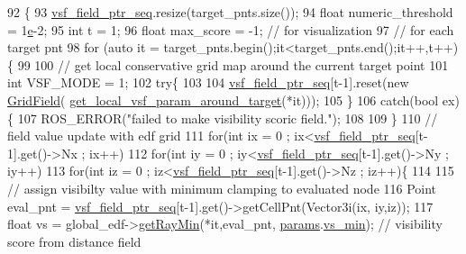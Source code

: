 \begin{DoxyCode}
92                                                                                             \{
93     \hyperlink{class_preplanner_aab0f91e34b86eaa581c7642ba5059308}{vsf\_field\_ptr\_seq}.resize(target\_pnts.size());
94     \textcolor{keywordtype}{float} numeric\_threshold = 1\hyperlink{namespace__setup__util_acdce690b925de33d6249bbbfa1109d61}{e}-2;
95     \textcolor{keywordtype}{int} t = 1;
96     \textcolor{keywordtype}{float} max\_score = -1;  \textcolor{comment}{// for visualization }
97     \textcolor{comment}{// for each target pnt}
98     \textcolor{keywordflow}{for} (\textcolor{keyword}{auto} it = target\_pnts.begin();it<target\_pnts.end();it++,t++)\{
99         
100         \textcolor{comment}{// get local conservative grid map around the current target point}
101         \textcolor{keywordtype}{int} VSF\_MODE = 1;
102         \textcolor{keywordflow}{try}\{
103 
104             \hyperlink{class_preplanner_aab0f91e34b86eaa581c7642ba5059308}{vsf\_field\_ptr\_seq}[t-1].reset(\textcolor{keyword}{new} \hyperlink{struct_grid_field}{GridField}(
      \hyperlink{class_preplanner_a5b038984427471115b1f4be24abf43b0}{get\_local\_vsf\_param\_around\_target}(*it))); 
105         \}
106         \textcolor{keywordflow}{catch}(\textcolor{keywordtype}{bool} ex)\{
107             ROS\_ERROR(\textcolor{stringliteral}{"failed to make visibility scoric field."});
108 
109         \}
110         \textcolor{comment}{// field value update with edf grid }
111         \textcolor{keywordflow}{for}(\textcolor{keywordtype}{int} ix = 0 ; ix<\hyperlink{class_preplanner_aab0f91e34b86eaa581c7642ba5059308}{vsf\_field\_ptr\_seq}[t-1].get()->Nx ; ix++)
112             \textcolor{keywordflow}{for}(\textcolor{keywordtype}{int} iy = 0 ; iy<\hyperlink{class_preplanner_aab0f91e34b86eaa581c7642ba5059308}{vsf\_field\_ptr\_seq}[t-1].get()->Ny ; iy++)
113                 \textcolor{keywordflow}{for}(\textcolor{keywordtype}{int} iz = 0 ; iz<\hyperlink{class_preplanner_aab0f91e34b86eaa581c7642ba5059308}{vsf\_field\_ptr\_seq}[t-1].get()->Nz ; iz++)\{
114                     
115                     \textcolor{comment}{// assign visibilty value with minimum clamping to evaluated node }
116                     Point eval\_pnt = \hyperlink{class_preplanner_aab0f91e34b86eaa581c7642ba5059308}{vsf\_field\_ptr\_seq}[t-1].get()->getCellPnt(Vector3i(ix,
      iy,iz));      
117                     \textcolor{keywordtype}{float} vs = global\_edf->\hyperlink{struct_grid_field_af9f5144af2f0cdb99784ea54c42a8516}{getRayMin}(*it,eval\_pnt,
      \hyperlink{class_preplanner_a679cc4b70f041aff73769e7ec92dc5d0}{params}.\hyperlink{structchaser_1_1_preplanner_params_a2abe7915546a5d2ebde667a1d5ccfb44}{vs\_min}); \textcolor{comment}{// visibility score from distance field                    }

\end{DoxyCode}

